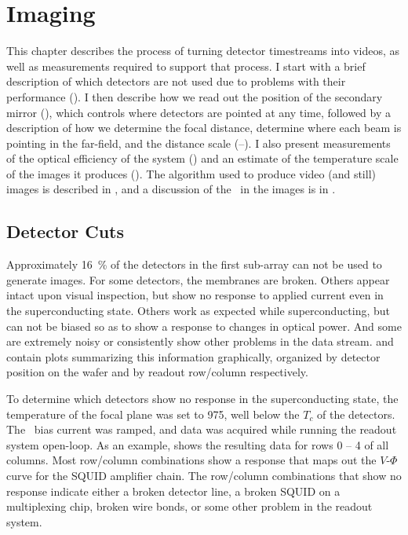 \chapter{Imaging}\label{c:imaging}



This chapter describes the process of turning detector timestreams into videos, as well as measurements required to support that process.
I start with a brief description of which detectors are not used due to problems with their performance ().
I then describe how we read out the position of the secondary mirror (), which controls where detectors are pointed at any time, followed by a description of how we determine the focal distance, determine where each beam is pointing in the far-field, and the distance scale (--).
I also present measurements of the optical efficiency of the system () and an estimate of the temperature scale of the images it produces ().
The algorithm used to produce video (and still) images is described in , and a discussion of the \NETD\ in the images is in .

\section{Detector Cuts} \label{sec:ch7-det-cuts}

Approximately \SI{16}{\percent} of the detectors in the first sub-array can not be used to generate images.
For some detectors, the membranes are broken.
Others appear intact upon visual inspection, but show no response to applied current even in the superconducting state.
Others work as expected while superconducting, but can not be biased so as to show a response to changes in optical power. 
And some are extremely noisy or consistently show other problems in the data stream.
 and  contain plots summarizing this information graphically, organized by detector position on the wafer and by readout row/column respectively.

To determine which detectors show no response in the superconducting state, the temperature of the focal plane was set to \SI{975}{\mK}, well below the $T_c$ of the detectors.
The \TES\ bias current was ramped, and data was acquired while running the readout system open-loop.
As an example,  shows the resulting data for rows 0 -- 4 of all columns.
Most row/column combinations show a response that maps out the $V$-$\Phi$ curve for the SQUID amplifier chain.
The row/column combinations that show no response indicate either a broken detector line, a broken SQUID on a multiplexing chip, broken wire bonds, or some other problem in the readout system.

